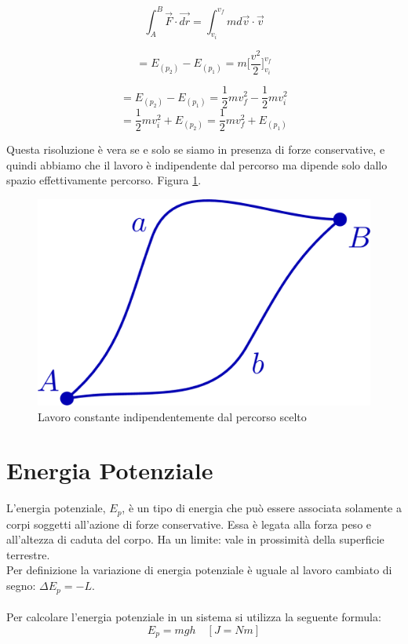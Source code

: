\begin{equation*}
     \int_{A}^{B} \vec{F} \cdot \vec{dr} = \int_{v_i}^{v_f} md\vec{v}\cdot \vec{v}
\end{equation*}

\begin{equation*}
    = E_{(p_2)} - E_{(p_1)} = m \biggl[\frac{v^2}{2}\biggl]_{v_i}^{v_f}
\end{equation*}

\begin{equation*}
    = E_{(p_2)} - E_{(p_1)} = \frac{1}{2}mv_f^2 - \frac{1}{2}mv_i^2
\end{equation*}
\begin{equation}
    = \frac{1}{2}mv_i^2 + E_{(p_2)}  =  \frac{1}{2}mv_f^2 + E_{(p_1)}
\end{equation}

Questa risoluzione è vera se e solo se siamo in presenza di forze conservative, e quindi abbiamo che il lavoro è indipendente dal percorso ma dipende solo dallo spazio effettivamente percorso. Figura \ref{fig:lavoroCostante}.

\begin{figure}[tb]
    \centering
    \includegraphics[width = 0.45 \textwidth]{image/lavoroNonDipDallaTraiett.png}
    \caption{Lavoro constante indipendentemente dal percorso scelto}
    \label{fig:lavoroCostante}
\end{figure}

\section{Energia Potenziale}
L'energia potenziale, $E_p$, è un tipo di energia che può essere associata solamente a corpi soggetti all'azione di forze conservative.
Essa è legata alla forza peso e all'altezza di caduta del corpo. Ha un limite: vale in prossimità della superficie terrestre.\\
Per definizione la variazione di energia potenziale è uguale al lavoro cambiato di segno: $\Delta E_p = -L$.\\
\paragraph{}
Per calcolare l'energia potenziale in un sistema si utilizza la seguente formula:
\begin{equation}
    E_p = mgh\quad[J = Nm]
    \label{energiaPotenziale}
\end{equation}


